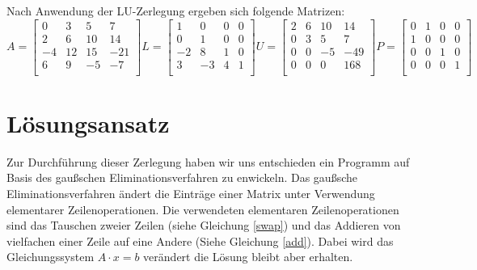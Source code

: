 \documentclass[course=erap]{aspdoc}
\begin{document}
Nach Anwendung der LU-Zerlegung ergeben sich folgende Matrizen:
  \begin{equation}
    A = \begin{bmatrix}
    0	& 3	 & 5  & 7 \\
    2	& 6	 & 10 & 14 \\
    -4	& 12 & 15 & -21\\
    6	& 9  & -5 & -7\\
    \end{bmatrix}
    L =
    \begin{bmatrix}
    1	& 0	 & 0  & 0 \\
    0	& 1	 & 0 & 0 \\
    -2	& 8 & 1 & 0\\
    3	& -3  & 4 & 1\\
    \end{bmatrix}
    U =
    \begin{bmatrix}
    2	& 6	 & 10 & 14 \\
    0	& 3	 & 5 &  7 \\
    0	& 0  & -5 & -49\\
    0	& 0  & 0 &  168\\
    \end{bmatrix}
    P =
    \begin{bmatrix}
    0	& 1	 & 0 & 0 \\
    1	& 0	 & 0 & 0 \\
    0	& 0  & 1 & 0\\
    0	& 0  & 0 & 1\\
    \end{bmatrix}
  \end{equation}
 
 

\section{Lösungsansatz}
Zur Durchführung dieser Zerlegung haben wir uns entschieden ein Programm auf Basis des gaußschen Eliminationsverfahren zu enwickeln.
Das gaußsche Eliminationsverfahren ändert die Einträge einer Matrix unter Verwendung elementarer Zeilenoperationen.
Die verwendeten elementaren Zeilenoperationen sind das Tauschen zweier Zeilen (siehe Gleichung \ref{swap}) und das Addieren von
vielfachen einer Zeile auf eine Andere (Siehe Gleichung \ref{add}). 
 Dabei wird das Gleichungssystem $A \cdot x = b$ verändert die Lösung bleibt aber erhalten.\\
\end{document}
